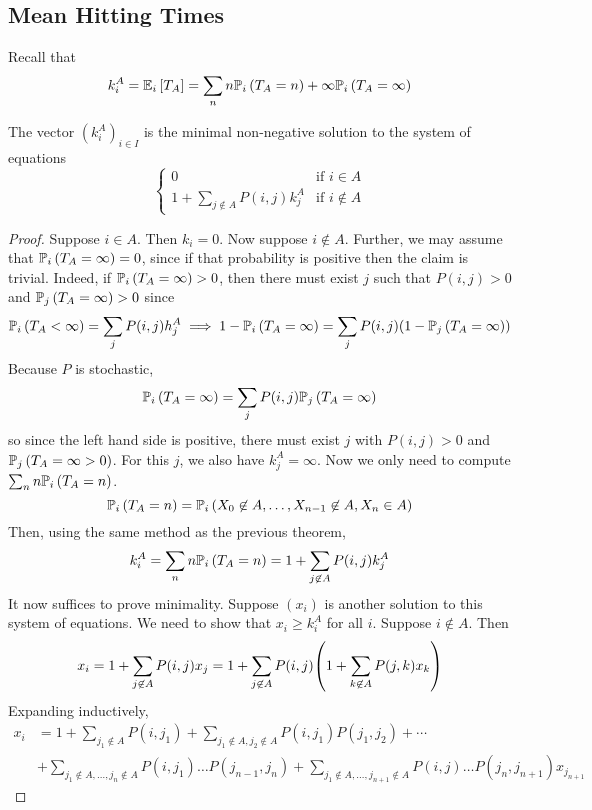 \subsection{Mean Hitting Times}
Recall that
\[
	k_i^A = \mathbb{E}_{i}\left[{T_A}\right] = \sum_n n \mathbb{P}_{i}\left({T_A = n}\right) + \infty \mathbb{P}_{i}\left({T_A = \infty}\right)
\]
\begin{theorem}
	The vector \( (k_i^A)_{i \in I} \) is the minimal non-negative solution to the system of equations
	\[
		\begin{cases}
			0                                   & \text{if } i \in A     \\
			1 + \sum_{j \not\in A} P(i,j) k_j^A & \text{if } i \not\in A
		\end{cases}
	\]
\end{theorem}
\begin{proof}
	Suppose \( i \in A \).
	Then \( k_i = 0 \).
	Now suppose \( i \not\in A \).
	Further, we may assume that \( \mathbb{P}_{i}\left({T_A = \infty}\right) = 0 \), since if that probability is positive then the claim is trivial.
	Indeed, if \( \mathbb{P}_{i}\left({T_A = \infty}\right) > 0 \), then there must exist \( j \) such that \( P(i,j) > 0 \) and \( \mathbb{P}_{j}\left({T_A = \infty}\right) > 0 \) since
	\[
		\mathbb{P}_{i}\left({T_A < \infty}\right) = \sum_j P(i,j) h_j^A \implies 1 - \mathbb{P}_{i}\left({T_A = \infty}\right) = \sum_j P(i,j) \qty(1 - \mathbb{P}_{j}\left({T_A = \infty}\right))
	\]
	Because \( P \) is stochastic,
	\[
		\mathbb{P}_{i}\left({T_A = \infty}\right) = \sum_j P(i,j) \mathbb{P}_{j}\left({T_A = \infty}\right)
	\]
	so since the left hand side is positive, there must exist \( j \) with \( P(i,j) > 0 \) and \( \mathbb{P}_{j}\left({T_A = \infty > 0}\right) \).
	For this \( j \), we also have \( k_j^A = \infty \).
	Now we only need to compute \( \sum_n n\mathbb{P}_{i}\left({T_A = n}\right) \).
	\[
		\mathbb{P}_{i}\left({T_A = n}\right) = \mathbb{P}_{i}\left({X_0 \not\in A, \dots, X_{n-1} \not\in A, X_n \in A}\right)
	\]
	Then, using the same method as the previous theorem,
	\[
		k_i^A = \sum_n n \mathbb{P}_{i}\left({T_A = n}\right) = 1 + \sum_{j \not\in A} P(i,j) k_j^A
	\]
	It now suffices to prove minimality.
	Suppose \( (x_i) \) is another solution to this system of equations.
	We need to show that \( x_i \geq k_i^A \) for all \( i \).
	Suppose \( i \not\in A \).
	Then
	\[
		x_i = 1 + \sum_{j \not\in A} P(i,j) x_j = 1 + \sum_{j \not\in A} P(i,j) \qty(1 + \sum_{k \not\in A} P(j,k) x_k)
	\]
	Expanding inductively,
	\begin{align*}
		x_i &= 1 + \sum_{j_1 \not\in A} P(i,j_1) + \sum_{j_1 \not\in A, j_2 \not\in A} P(i,j_1)P(j_1,j_2) + \cdots \\
		&+ \sum_{j_1 \not\in A, \dots, j_n \not\in A} P(i,j_1) \dots P(j_{n-1}, j_n) + \sum_{j_1 \not\in A, \dots, j_{n+1} \not\in A} P(i,j) \dots P(j_n,j_{n+1})x_{j_{n+1}}

\end{align*}
\end{proof}
